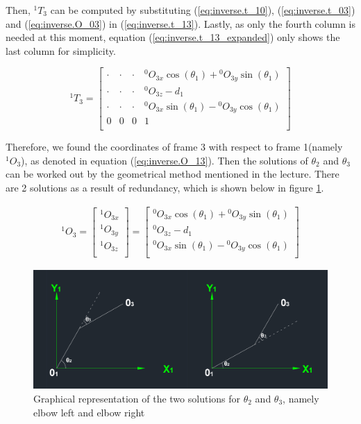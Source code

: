 \documentclass{article}
\renewcommand{\c}[1]{\cos(\theta_{#1})}
\newcommand{\s}[1]{\sin(\theta_{#1})}
\newcommand{\T}[2]{{}^{#1}T_{#2}}
\renewcommand{\O}[2]{{}^{#1}O_{#2}}
\begin{document}
Then, $\T{1}{3}$ can be computed by substituting (\ref{eq:inverse.t_10}), (\ref{eq:inverse.t_03}) and (\ref{eq:inverse.O_03}) in (\ref{eq:inverse.t_13}). Lastly, as only the fourth column is needed at this moment, equation (\ref{eq:inverse.t_13_expanded}) only shows the last column for simplicity.

\begin{equation}
\label{eq:inverse.t_13_expanded}
\T{1}{3} = \left[ \begin{array}{cccc}
	\cdot & \cdot & \cdot & \O{0}{3x} \c{1} + \O{0}{3y} \s{1} \\
	\cdot & \cdot & \cdot & \O{0}{3z}-d_1 \\
	\cdot & \cdot & \cdot & \O{0}{3x} \s{1}-\O{0}{3y} \c{1} \\
	0 & 0 & 0 & 1 \\
\end{array} \right]
\end{equation}

Therefore, we found the coordinates of frame 3 with respect to frame 1(namely $\O{1}{3}$), as denoted in equation (\ref{eq:inverse.O_13}). Then the solutions of  $\theta_2$ and  $\theta_3$ can be worked out by the geometrical method mentioned in the lecture. There are 2 solutions as a result of redundancy, which is shown below in figure \ref{fig:theta_2,theta_3}.

\begin{align}
\label{eq:inverse.O_13}
\O{1}{3} = 
\left[ \begin{array}{c}
	\O{1}{3x} \\
	\O{1}{3y} \\
	\O{1}{3z} \\
\end{array} \right] = \left[ \begin{array}{c}
	\O{0}{3x} \c{1} + \O{0}{3y} \s{1} \\
	\O{0}{3z}-d_1 \\
	\O{0}{3x} \s{1}-\O{0}{3y} \c{1} \\
\end{array} \right]
\end{align}

\begin{figure}[htbp] 
\begin{center}
\includegraphics[width=\textwidth]{images/theta2,theta3}
\caption{Graphical representation of the two solutions for $\theta_2$ and $\theta_3$, namely elbow left and elbow right}
\label{fig:theta_2,theta_3}
\end{center}
\end{figure}
\end{document}
